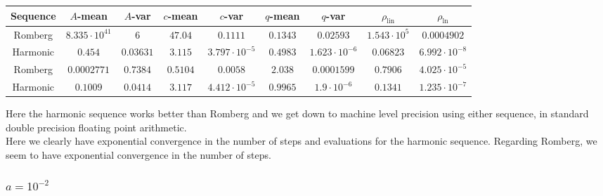 \begin{table}[H]
    \centering
    \small
    \begin{tabular}{c||c|c|c|c|c|c|c|c}
Sequence & \(A\)-mean & \(A\)-var & \(c\)-mean & \(c\)-var & \(q\)-mean & \(q\)-var & \(\rho_{\operatorname{lin}}\) & \(\rho_{\ln}\)\\\hline
\rowcolor{red}
Romberg & \(8.335\cdot 10^{41}\) & \(6\) & \(47.04\) & \(0.1111\) & \(0.1343\) & \(0.02593\) & \(1.543\cdot 10^5\) & \(0.0004902\) \\
\rowcolor{green}
Harmonic & \(0.454\) & \(0.03631\) & \(3.115\) & \(3.797\cdot 10^{-5}\) & \(0.4983\) & \(1.623\cdot 10^{-6}\) & \(0.06823\) & \(6.992\cdot 10^{-8}\) \\
\rowcolor{green}
Romberg & \(0.0002771\) & \(0.7384\) & \(0.5104\) & \(0.0058\) & \(2.038\) & \(0.0001599\) & \(0.7906\) & \(4.025\cdot 10^{-5}\) \\
\rowcolor{green}
Harmonic & \(0.1009\) & \(0.0414\) & \(3.117\) & \(4.412\cdot 10^{-5}\) & \(0.9965\) & \(1.9\cdot 10^{-6}\) & \(0.1341\) & \(1.235\cdot 10^{-7}\) \\
    \end{tabular}
    \label{tab:my_label}
\end{table}

Here the harmonic sequence works better than Romberg and we get down to machine level precision using either sequence, in standard double precision floating point arithmetic.\\

Here we clearly have exponential convergence in the number of steps and evaluations for the harmonic sequence. Regarding Romberg, we seem to have exponential convergence in the number of steps.

\subsubsection{\(a = 10^{-2}\)}

